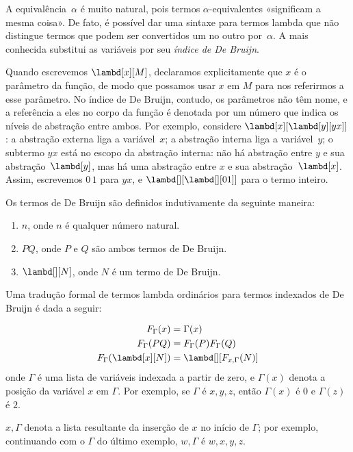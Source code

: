 \documentclass[../../../include/open-logic-section]{subfiles}
\begin{document}


A equivalência~$\alpha$ é muito natural, pois termos
$\alpha$-equivalentes «significam a mesma coisa». De fato, é possível dar
uma sintaxe para termos lambda que não distingue termos que podem ser
convertidos um no outro por~$\alpha$. A mais conhecida substitui as variáveis
por seu \emph{índice de De Bruijn}.

Quando escrevemos $\lambd[x][M]$, declaramos explicitamente que $x$ é o
parâmetro da função, de modo que possamos usar $x$ em $M$ para nos referirmos
a esse parâmetro. No índice de De Bruijn, contudo, os parâmetros não têm nome,
e a referência a eles no corpo da função é denotada por um número que indica
os níveis de abstração entre ambos. Por exemplo, considere
$\lambd[x][\lambd[y][y x]]$: a abstração externa liga a variável~$x$; a
abstração interna liga a variável~$y$; o subtermo $y x$ está no escopo da
abstração interna: não há abstração entre $y$ e sua abstração~$\lambd[y]$,
mas há uma abstração entre $x$ e sua abstração~$\lambd[x]$. Assim, escrevemos
$0\, 1$ para $y x$, e $\lambd[][\lambd[][01]]$ para o termo inteiro.

\begin{defn}
  Os termos de De Bruijn são definidos indutivamente da seguinte maneira:
  \begin{enumerate}
  \item $n$, onde $n$ é qualquer número natural.
  \item $PQ$, onde $P$ e $Q$ são ambos termos de De Bruijn.
  \item $\lambd[][N]$, onde $N$ é um termo de De Bruijn.
  \end{enumerate}
\end{defn}

Uma tradução formal de termos lambda ordinários para termos indexados de De
Bruijn é dada a seguir:
\begin{defn}
  \begin{align*}
    F_\Gamma(x) &= \Gamma(x) \\
    F_\Gamma(PQ) &= F_\Gamma(P)F_\Gamma(Q) \\
    F_\Gamma(\lambd[x][N]) &= \lambd[][F_{x,\Gamma}(N)]
  \end{align*}
  onde $\Gamma$ é uma lista de variáveis indexada a partir de zero, e
  $\Gamma(x)$ denota a posição da variável $x$ em $\Gamma$. Por exemplo, se
  $\Gamma$ é $x,y,z$, então $\Gamma(x)$ é $0$ e $\Gamma(z)$ é $2$.
  
  $x,\Gamma$ denota a lista resultante da inserção de $x$ no início de
  $\Gamma$; por exemplo, continuando com o $\Gamma$ do último exemplo,
  $w,\Gamma$ é $w,x,y,z$.
\end{defn}
\end{document}

